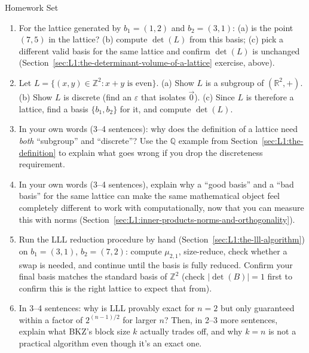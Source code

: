 \begin{exercisebox}{Homework Set}
\begin{enumerate}[leftmargin=*]
  \item For the lattice generated by $b_1=(1,2)$ and $b_2=(3,1)$: (a) is the point $(7,5)$ in the lattice? (b) compute $\det(L)$ from this basis; (c) pick a different valid basis for the same lattice and confirm $\det(L)$ is unchanged (Section~\ref{sec:L1:the-determinant-volume-of-a-lattice} exercise, above).
  \item Let $L = \{(x,y) \in \mathbb{Z}^2 : x + y \text{ is even}\}$. (a) Show $L$ is a subgroup of $(\mathbb{R}^2, +)$. (b) Show $L$ is discrete (find an $\varepsilon$ that isolates $\vec 0$). (c) Since $L$ is therefore a lattice, find a basis $\{b_1, b_2\}$ for it, and compute $\det(L)$.
  \item In your own words (3--4 sentences): why does the definition of a lattice need \emph{both} ``subgroup'' and ``discrete''? Use the $\mathbb{Q}$ example from Section~\ref{sec:L1:the-definition} to explain what goes wrong if you drop the discreteness requirement.
  \item In your own words (3--4 sentences), explain why a ``good basis'' and a ``bad basis'' for the same lattice can make the same mathematical object feel completely different to work with computationally, now that you can measure this with norms (Section~\ref{sec:L1:inner-products-norms-and-orthogonality}).
  \item Run the LLL reduction procedure by hand (Section~\ref{sec:L1:the-lll-algorithm}) on $b_1=(3,1)$, $b_2=(7,2)$: compute $\mu_{2,1}$, size-reduce, check whether a swap is needed, and continue until the basis is fully reduced. Confirm your final basis matches the standard basis of $\mathbb{Z}^2$ (check $|\det(B)|=1$ first to confirm this is the right lattice to expect that from).
  \item In 3--4 sentences: why is LLL provably exact for $n=2$ but only guaranteed within a factor of $2^{(n-1)/2}$ for larger $n$? Then, in 2--3 more sentences, explain what BKZ's block size $k$ actually trades off, and why $k=n$ is not a practical algorithm even though it's an exact one.
\end{enumerate}
\end{exercisebox}

